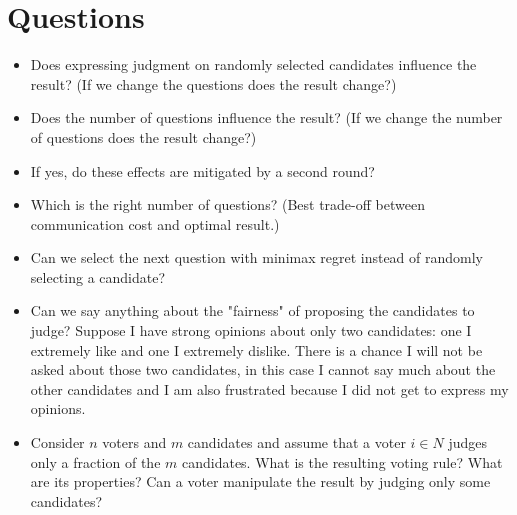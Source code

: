 \documentclass[version=3.21, pagesize, twoside=off, bibliography=totoc, DIV=calc, fontsize=12pt, a4paper]{scrartcl}
\begin{document}
\newpage

\newpage
\appendix
\section{Questions}
\begin{itemize}
	\item Does expressing judgment on randomly selected candidates influence the result? (If we change the questions does the result change?)
	\item Does the number of questions influence the result? (If we change the number of questions does the result change?)
	\item If yes, do these effects are mitigated by a second round?
	\item Which is the right number of questions? (Best trade-off between communication cost and optimal result.)
	\item Can we select the next question with minimax regret instead of randomly selecting a candidate?
	\item Can we say anything about the "fairness" of proposing the candidates to judge? Suppose I have strong opinions about only two candidates: one I extremely like and one I extremely dislike. There is a chance I will not be asked about those two candidates, in this case I cannot say much about the other candidates and I am also frustrated because I did not get to express my opinions.
	\item Consider $n$ voters and $m$ candidates and assume that a voter $i \in N$ judges only a fraction of the $m$ candidates. What is the resulting voting rule? What are its properties? Can a voter manipulate the result by judging only some candidates? 
\end{itemize}
\end{document}
